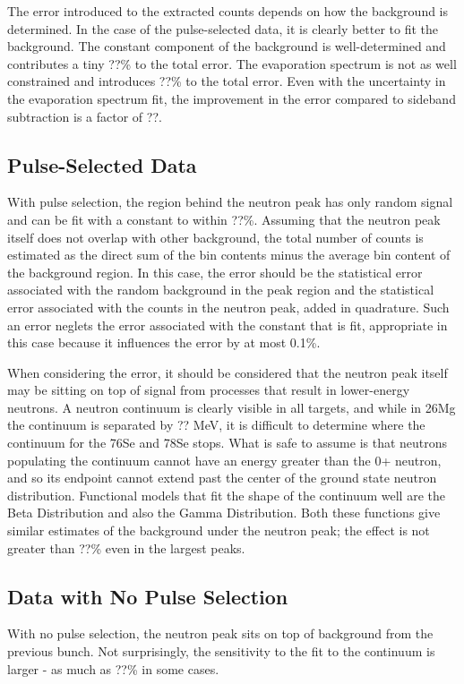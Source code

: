 The error introduced to the extracted counts depends on how the background is determined.  In the case of the pulse-selected data, it is clearly better to fit the background.  The constant component of the background is well-determined and contributes a tiny ??\% to the total error.  The evaporation spectrum is not as well constrained and introduces ??\% to the total error.  Even with the uncertainty in the evaporation spectrum fit, the improvement in the error compared to sideband subtraction is a factor of ??.

\subsection{Pulse-Selected Data}
With pulse selection, the region behind the neutron peak has only random signal and can be fit with a constant to within ??\%.  Assuming that the neutron peak itself does not overlap with other background, the total number of counts is estimated as the direct sum of the bin contents minus the average bin content of the background region.  In this case, the error should be the statistical error associated with the random background in the peak region and the statistical error associated with the counts in the neutron peak, added in quadrature.  Such an error neglets the error associated with the constant that is fit, appropriate in this case because it influences the error by at most 0.1\%.

When considering the error, it should be considered that the neutron peak itself may be sitting on top of signal from processes that result in lower-energy neutrons.  A neutron continuum is clearly visible in all targets, and while in 26Mg the continuum is separated by ?? MeV, it is difficult to determine where the continuum for the 76Se and 78Se stops.  What is safe to assume is that neutrons populating the continuum cannot have an energy greater than the 0+ neutron, and so its endpoint cannot extend past the center of the ground state neutron distribution.  Functional models that fit the shape of the continuum well are the Beta Distribution and also the Gamma Distribution.  Both these functions give similar estimates of the background under the neutron peak; the effect is not greater than ??\% even in the largest peaks.

\subsection{Data with No Pulse Selection}
With no pulse selection, the neutron peak sits on top of background from the previous bunch.  Not surprisingly, the sensitivity to the fit to the continuum is larger - as much as ??\% in some cases.

